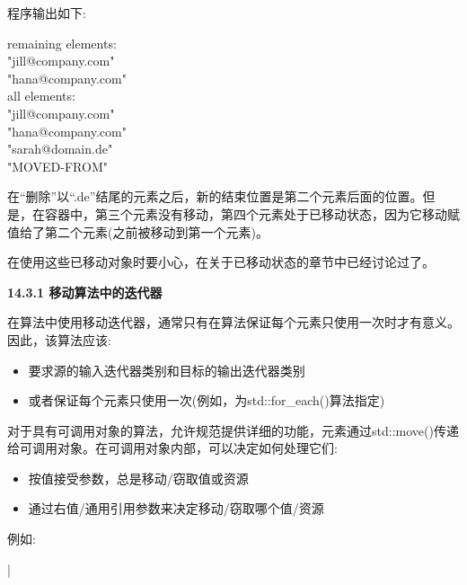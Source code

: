 程序输出如下:\par

\begin{tcolorbox}[colback=white,colframe=black]
remaining elements: \\
"jill@company.com" \\
"hana@company.com" \\
all elements: \\
"jill@company.com" \\
"hana@company.com" \\
"sarah@domain.de" \\
"MOVED-FROM"
\end{tcolorbox}	

在“删除”以“.de”结尾的元素之后，新的结束位置是第二个元素后面的位置。但是，在容器中，第三个元素没有移动，第四个元素处于已移动状态，因为它移动赋值给了第二个元素(之前被移动到第一个元素)。\par

在使用这些已移动对象时要小心，在关于已移动状态的章节中已经讨论过了。\par

\hspace*{\fill} \par %
\textbf{14.3.1 移动算法中的迭代器}

在算法中使用移动迭代器，通常只有在算法保证每个元素只使用一次时才有意义。因此，该算法应该:\par

\begin{itemize}
	\item 要求源的输入迭代器类别和目标的输出迭代器类别
	\item 或者保证每个元素只使用一次(例如，为std::for\_each()算法指定)
\end{itemize}

对于具有可调用对象的算法，允许规范提供详细的功能，元素通过std::move()传递给可调用对象。在可调用对象内部，可以决定如何处理它们:\par

\begin{itemize}
	\item 按值接受参数，总是移动/窃取值或资源
	\item 通过右值/通用引用参数来决定移动/窃取哪个值/资源
\end{itemize}

例如:\par

{\color{red}{lib/foreachmove.cpp}}|\par

